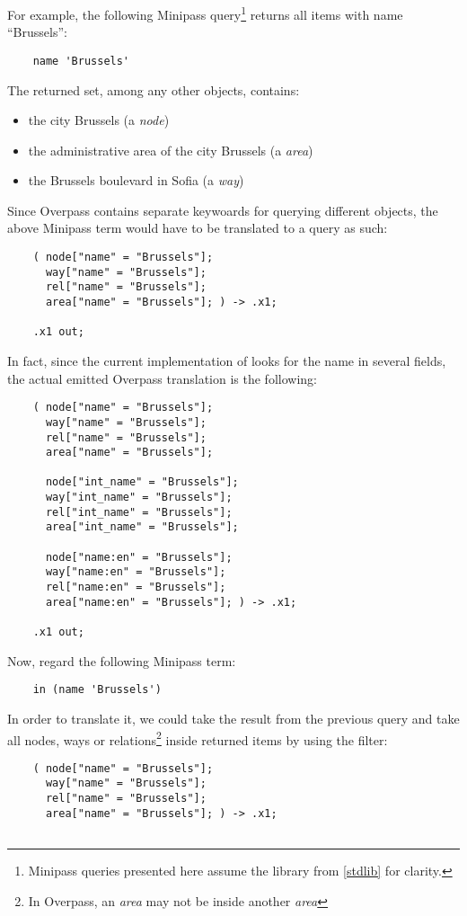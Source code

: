\documentclass[main.tex]{subfiles}
\begin{document}
\begin{example}
For example, the following Minipass
query\footnote{
    Minipass queries presented here assume the library from \cref{stdlib}
    for clarity.
} returns all items with name ``Brussels'':
\begin{lstwrap}\begin{lstlisting}
    name 'Brussels'
\end{lstlisting}\end{lstwrap}
The returned set, among any other objects, contains:
\begin{itemize}
    \item the city Brussels (a \emph{node})
    \item the administrative area of the city Brussels (a \emph{area})
    \item the Brussels boulevard in Sofia (a \emph{way})
\end{itemize}
Since Overpass contains separate keywoards for querying different objects,
the above Minipass term would have to be translated to a query as such:
\begin{lstwrap}\begin{lstlisting}
    ( node["name" = "Brussels"];
      way["name" = "Brussels"];
      rel["name" = "Brussels"];
      area["name" = "Brussels"]; ) -> .x1;

    .x1 out;
\end{lstlisting}\end{lstwrap}
In fact, since the current implementation of  looks for the
name in several fields, the actual emitted Overpass translation is the
following:
\begin{lstwrap}\begin{lstlisting}
    ( node["name" = "Brussels"];
      way["name" = "Brussels"];
      rel["name" = "Brussels"];
      area["name" = "Brussels"];

      node["int_name" = "Brussels"];
      way["int_name" = "Brussels"];
      rel["int_name" = "Brussels"];
      area["int_name" = "Brussels"];

      node["name:en" = "Brussels"];
      way["name:en" = "Brussels"];
      rel["name:en" = "Brussels"];
      area["name:en" = "Brussels"]; ) -> .x1;

    .x1 out;
\end{lstlisting}\end{lstwrap}

Now, regard the following Minipass term:
\begin{lstwrap}\begin{lstlisting}
    in (name 'Brussels')
\end{lstlisting}\end{lstwrap}
In order to translate it, we could take the result from the previous query
and take all nodes, ways or relations\footnote{In Overpass, an \emph{area} may
    not be inside another \emph{area}} inside returned items by using the
 filter:
\begin{lstwrap}\begin{lstlisting}
    ( node["name" = "Brussels"];
      way["name" = "Brussels"];
      rel["name" = "Brussels"];
      area["name" = "Brussels"]; ) -> .x1;


\end{lstlisting}
\end{lstwrap}
\end{example}
\end{document}
